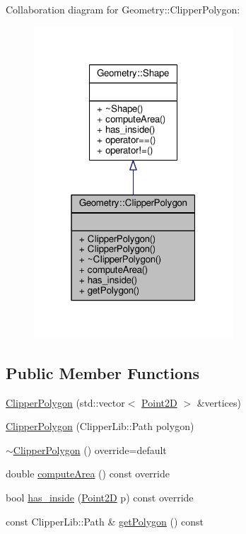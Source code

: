 Collaboration diagram for Geometry\+:\+:Clipper\+Polygon\+:\nopagebreak
\begin{figure}[H]
\begin{center}
\leavevmode
\includegraphics[width=211pt]{classGeometry_1_1ClipperPolygon__coll__graph}
\end{center}
\end{figure}
\subsection*{Public Member Functions}
\begin{DoxyCompactItemize}
\item 
\hyperlink{classGeometry_1_1ClipperPolygon_a8bb6fe04895b246e3acd28aa41158f09}{Clipper\+Polygon} (std\+::vector$<$ \hyperlink{classGeometry_1_1Point2D}{Point2\+D} $>$ \&vertices)
\item 
\hyperlink{classGeometry_1_1ClipperPolygon_a80bebeb5652e9ddd9e6582c1c023b1d6}{Clipper\+Polygon} (Clipper\+Lib\+::\+Path polygon)
\item 
\hyperlink{classGeometry_1_1ClipperPolygon_a5d266f89ec4621b9e3a4b0ea498da328}{$\sim$\+Clipper\+Polygon} () override=default
\item 
double \hyperlink{classGeometry_1_1ClipperPolygon_a452292446e85bf39afc64350180a289a}{compute\+Area} () const override
\item 
bool \hyperlink{classGeometry_1_1ClipperPolygon_a8e863b1d54c4ccc8c9d84bcccbbb137f}{has\+\_\+inside} (\hyperlink{classGeometry_1_1Point2D}{Point2\+D} p) const override
\item 
const Clipper\+Lib\+::\+Path \& \hyperlink{classGeometry_1_1ClipperPolygon_ac1528fc32d76cb7a970e3649a53ec5ef}{get\+Polygon} () const 
\end{DoxyCompactItemize}
